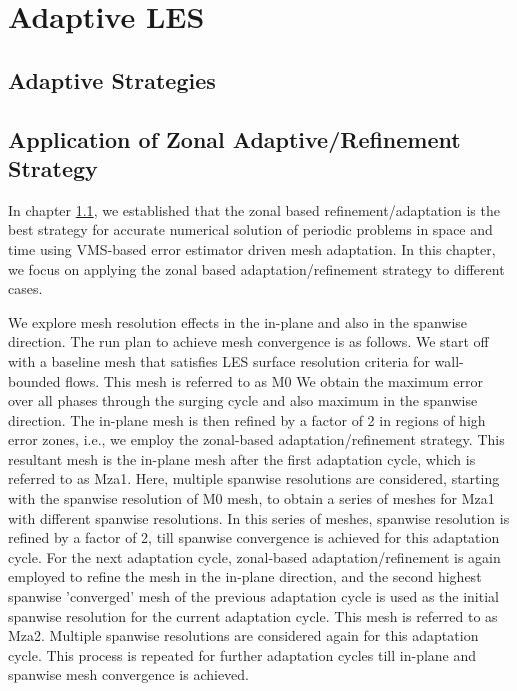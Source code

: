 \chapter{Adaptive LES}

\section{Adaptive Strategies}

\label{sec:adaptive_strategy_comparison}


\section{Application of Zonal Adaptive/Refinement Strategy}
In chapter \ref{sec:adaptive_strategy_comparison}, we established that the zonal based refinement/adaptation is the best strategy for accurate numerical solution of periodic problems in space and time using VMS-based error estimator driven mesh adaptation. In this chapter, we focus on applying the zonal based adaptation/refinement strategy to different cases.

We explore mesh resolution effects in the in-plane and also in the spanwise direction. 
The run plan to achieve mesh convergence is as follows. 
We start off with a baseline mesh that satisfies LES surface resolution criteria for wall-bounded flows. This mesh is referred to as M0
We obtain the maximum error over all phases through the surging cycle and also maximum in the spanwise direction.
The in-plane mesh is then refined by a factor of 2 in regions of high error zones, i.e., we employ the zonal-based adaptation/refinement strategy.
This resultant mesh is the in-plane mesh after the first adaptation cycle, which is referred to as Mza1.
Here, multiple spanwise resolutions are considered, starting with the spanwise resolution of M0 mesh, to obtain a series of meshes for Mza1 with different spanwise resolutions.
In this series of meshes, spanwise resolution is refined by a factor of 2, till spanwise convergence is achieved for this adaptation cycle. 
For the next adaptation cycle, zonal-based adaptation/refinement is again employed to refine the mesh in the in-plane direction, and the second highest spanwise 'converged' mesh of the previous adaptation cycle is used as the initial spanwise resolution for the current adaptation cycle. 
This mesh is referred to as Mza2.
Multiple spanwise resolutions are considered again for this adaptation cycle.
This process is repeated for further adaptation cycles till in-plane and spanwise mesh convergence is achieved.

